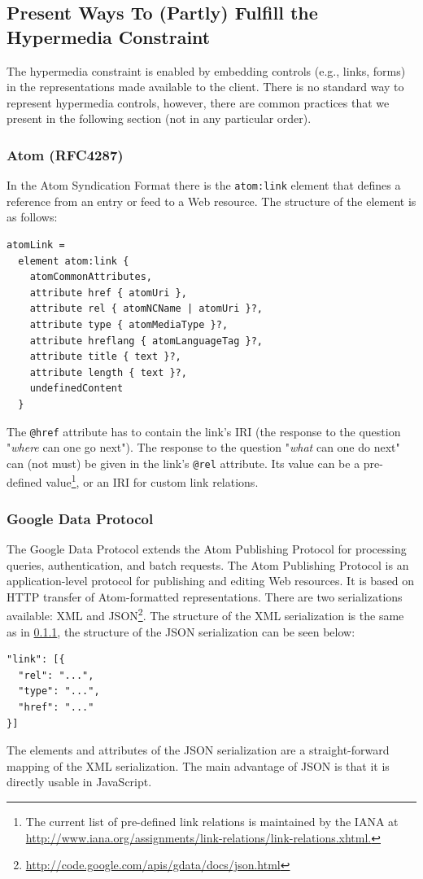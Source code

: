 \documentclass{acm_proc_article-sp}
\begin{document}
\subsection{Present Ways To (Partly) Fulfill the Hypermedia Constraint}\label{sec:currenthateoas}
The hypermedia constraint is enabled by embedding controls (e.g., links, forms) in the representations made available to the client. There is no standard way to represent hypermedia controls, however, there are common practices that we present in the following section (not in any particular order).

\subsubsection{Atom (RFC4287)}\label{sec:atom}
In the Atom Syndication Format \cite{Atom:Synd} there is the \texttt{atom:link} element that defines a reference from an entry or feed to a Web resource. The structure of the element is as follows:
\begin{verbatim}
atomLink =
  element atom:link {
    atomCommonAttributes,
    attribute href { atomUri },
    attribute rel { atomNCName | atomUri }?,
    attribute type { atomMediaType }?,
    attribute hreflang { atomLanguageTag }?,
    attribute title { text }?,
    attribute length { text }?,
    undefinedContent
  }
\end{verbatim}
The \texttt{@href} attribute has to contain the link's IRI (the response to the question "\textit{where} can one go next"). The response to the question "\textit{what} can one do next" can (not must) be given in the link's \texttt{@rel} attribute. Its value can be a pre-defined value\footnote{The current list of pre-defined link relations is maintained by the IANA at \url{http://www.iana.org/assignments/link-relations/link-relations.xhtml.}}, or an IRI for custom link relations.

\subsubsection{Google Data Protocol}\label{sec:gdata}
The Google Data Protocol\cite{Google:Data} extends the Atom Publishing Protocol\cite{Atom:Pub} for processing queries, authentication, and batch requests. The Atom Publishing Protocol is an application-level protocol for publishing and editing Web resources. It is based on HTTP transfer of Atom-formatted representations. There are two serializations available: XML and JSON\footnote{\url{http://code.google.com/apis/gdata/docs/json.html}}. The structure of the XML serialization is the same as in \ref{sec:atom}, the structure of the JSON serialization can be seen below:
\begin{verbatim}
"link": [{
  "rel": "...",
  "type": "...",
  "href": "..."
}]
\end{verbatim}
The elements and attributes of the JSON serialization are a straight-forward mapping of the XML serialization. The main advantage of JSON is that it is directly usable in JavaScript.
\end{document}
